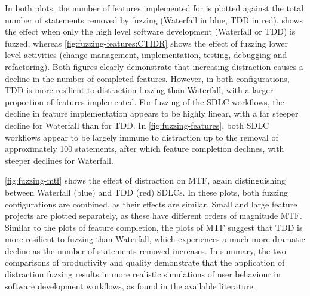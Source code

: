 \documentclass{llncs}
\begin{document}
In both plots, the number of features implemented for is plotted against the total number of statements removed by
fuzzing (Waterfall in blue, TDD in red).  shows the effect when only the high level
software development (Waterfall or TDD) is fuzzed, whereas \cref{fig:fuzzing-features:CTIDR} shows the effect of
fuzzing lower level activities (change management, implementation, testing, debugging and refactoring). Both figures
clearly demonstrate that increasing distraction causes a decline in the number of completed features. However, in both
configurations, TDD is more resilient to distraction fuzzing than Waterfall, with a larger proportion of features
implemented. For fuzzing of the SDLC workflows, the decline in feature implementation appears to be highly linear, with
a far steeper decline for Waterfall than for TDD. In \cref{fig:fuzzing-features}, both SDLC workflows appear to be
largely immune to distraction up to the removal of approximately 100 statements, after which feature completion
declines, with steeper declines for Waterfall.

\cref{fig:fuzzing-mtf} shows the effect of distraction on MTF, again distinguishing between Waterfall (blue) and
TDD (red) SDLCs.  In these plots, both fuzzing configurations are combined, as their effects are similar.  Small and
large feature projects are plotted separately, as these have different orders of magnitude MTF.  Similar to the plots
of feature completion, the plots of MTF suggest that TDD is more resilient to fuzzing than Waterfall, which experiences
a much more dramatic decline as the number of statements removed increases.  In summary, the two comparisons of
productivity and quality demonstrate that the application of distraction fuzzing results in more realistic simulations
of user behaviour in software development workflows, as found in the available literature.
\end{document}
